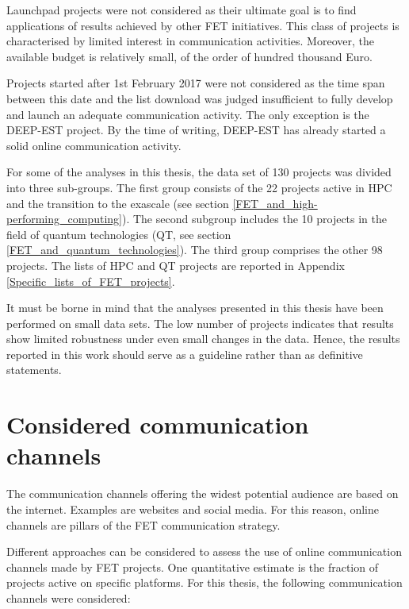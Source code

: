 Launchpad projects were not considered as their ultimate goal is to find applications of results achieved by other FET initiatives. This class of projects is characterised by limited interest in communication activities. Moreover, the available budget is relatively small, of the order of hundred thousand Euro. 

Projects started after 1st February 2017 were not considered as the time span between this date and the list download was judged insufficient to fully develop and launch an adequate communication activity. The only exception is the DEEP-EST project. By the time of writing, DEEP-EST has already started a solid online communication activity.    

For some of the analyses in this thesis, the data set of 130 projects was divided into three sub-groups.  The first group consists of the 22 projects active in HPC and the transition to the exascale (see section \ref{FET_and_high-performing_computing}). The second subgroup includes the 10 projects in the field of quantum technologies (QT, see section \ref{FET_and_quantum_technologies}). The third group comprises the other 98 projects. The lists of HPC and QT projects are reported in Appendix \ref{Specific_lists_of_FET_projects}.

It must be borne in mind that the analyses presented in this thesis have been performed on small data sets. The low number of projects indicates that results show limited robustness under even small changes in the data. Hence, the results reported in this work should serve as a guideline rather than as definitive statements.  

\section{Considered communication channels} \label{Considered_channels}
The communication channels offering the widest potential audience are based on the internet. Examples are websites and social media. For this reason, online channels are pillars of the FET communication strategy. 

Different approaches can be considered to assess the use of online communication channels made by FET projects. One quantitative estimate is the fraction of projects active on specific platforms. For this thesis, the following communication channels were considered:   

